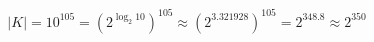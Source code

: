 \documentclass[preview,border=4pt]{standalone}
\begin{document}
\begin{equation}
|K| = 10^{105} = (2^{\log_2 10})^{105} \approx (2^{3.321928})^{105} = 2^{348.8} \approx 2^{350}
\end{equation}
\end{document}
